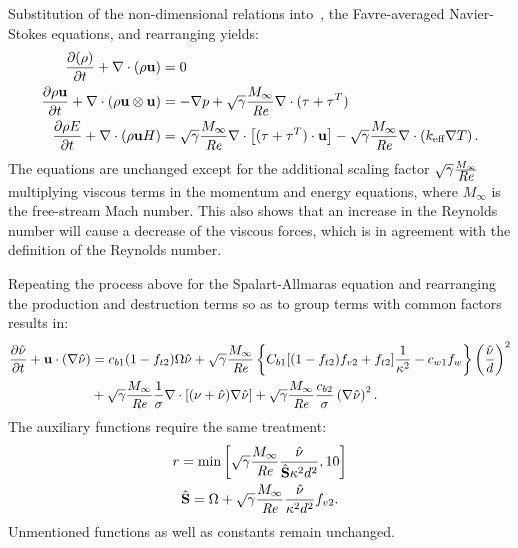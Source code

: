 Substitution of the non-dimensional relations into~, the Favre-averaged Navier-Stokes equations, and rearranging yields:
\begin{align}
      \frac{\partial (\rho )}{\partial t}  + \nabla \cdot (\rho  \mathbf{u})  &= 0 \\
     \frac{\partial \rho\mathbf{u}}{\partial t} 
    + \nabla\cdot(\rho\mathbf{u}\otimes\mathbf{u})
    &= -\nabla p + \sqrt{\gamma}\frac{M_\infty}{\mbox{\textit{Re}}}\nabla\cdot(\tau + \tau^T)
    \\
     \frac{\partial \rho E}{\partial t}  + \nabla\cdot (\rho \mathbf{u} H) &=
        \sqrt{\gamma}\frac{M_\infty}{\mbox{\textit{Re}}}\nabla\cdot \left[
            (\tau + \tau^T) \cdot \mathbf{u}
        \right]
        - \sqrt{\gamma}\frac{M_\infty}{\mbox{\textit{Re}}}\nabla\cdot\left(k_{\text{eff}}\nabla T\right) .
\end{align}
The equations are unchanged except for the additional scaling factor $\sqrt{\gamma}\frac{M_\infty}{\mbox{\textit{Re}}}$ multiplying viscous terms in the momentum and energy equations, where $M_\infty$ is the free-stream Mach number. This also shows that an increase in the Reynolds number will cause a decrease of the viscous forces, which is in agreement with the definition of the Reynolds number.

Repeating the process above for the Spalart-Allmaras equation and rearranging the production and destruction terms so as to group terms with common factors results in:
\begin{align}
\begin{split}
    \pdiff{\sa}{t} + \vec{u}\cdot(\nabla\sa) &=
        c_{b1}(1 - f_{t2})\Omega\sa
        + \ndim \left\{
            C_{b1}[(1 - f_{t2})f_{v2} + f_{t2}]\frac{1}{\kappa^2} - c_{w1}f_w
        \right\} \left(\frac{\sa}{d}\right)^2
        \\
        &+ \ndim \frac{1}{\sigma}\nabla\cdot\left[ (\nu + \sa) \nabla\sa \right]
        + \ndim \frac{c_{b2}}{\sigma}\left(\nabla \sa\right)^2.
\end{split}
\label{eq:synsa}
\end{align}
The auxiliary functions require the same treatment:
\begin{gather*}
    r = \text{min} \left[
        \ndim \frac{\sa}{\hat{S}\kappa^2 d^2}, 10
    \right] \\
    \hat{S} = \Omega + \ndim \frac{\sa}{\kappa^2 d^2} f_{v2}.
\end{gather*}
Unmentioned functions as well as constants remain unchanged.
\label{sec:synnondim}
%
